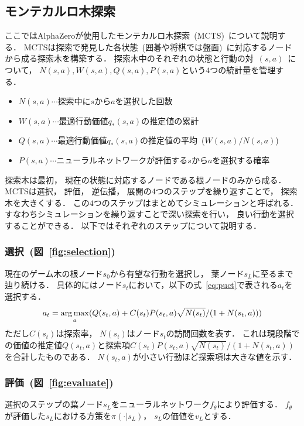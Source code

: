 \subsection{モンテカルロ木探索}
ここではAlphaZeroが使用したモンテカルロ木探索~(MCTS)~について説明する．
MCTSは探索で発見した各状態~(囲碁や将棋では盤面)~に対応するノードから成る探索木を構築する．
探索木中のそれぞれの状態と行動の対~$(s,a)$~について， ${N(s,a), W(s,a), Q(s,a), P(s,a)}$という$4$つの統計量を管理する．
\begin{itemize}
  \item $N(s,a) \cdots$探索中に$s$から$a$を選択した回数
  \item $W(s,a) \cdots$最適行動価値$q_*(s,a)$の推定値の累計
  \item $Q(s,a) \cdots$最適行動価値$q_*(s,a)$の推定値の平均~($W(s,a) / N(s,a)$)
  \item $P(s,a) \cdots$ニューラルネットワークが評価する$s$から$a$を選択する確率
\end{itemize}
探索木は最初， 現在の状態に対応するノードである根ノードのみから成る．
MCTSは選択， 評価， 逆伝播， 展開の$4$つのステップを繰り返すことで， 探索木を大きくする．
この$4$つのステップはまとめてシミュレーションと呼ばれる．
すなわちシミュレーションを繰り返すことで深い探索を行い， 良い行動を選択することができる．
以下ではそれぞれのステップについて説明する．
\subsubsection*{選択~(図~\ref{fig:selection})}
現在のゲーム木の根ノード$s_0$から有望な行動を選択し， 葉ノード$s_L$に至るまで辿り続ける．
具体的にはノード$s_t$において，以下の式~\ref{eq:puct}で表される$a_t$を選択する．
\begin{align}
  a_t = \operatorname*{arg\,max}_a(Q(s_t,a) + C(s_t)P(s_t,a)\sqrt{N(s_t)}/(1 + N(s_t,a)))
  \label{eq:puct}
\end{align}
ただし$C(s_t)$は探索率， $N(s_t)$はノード$s_t$の訪問回数を表す．
これは現段階での価値の推定値$Q(s_t,a)$と探索項$C(s_t)P(s_t,a)\sqrt{N(s_t)}/(1 + N(s_t,a))$を合計したものである．
$N(s_t,a)$が小さい行動ほど探索項は大きな値を示す．

\subsubsection*{評価~(図~\ref{fig:evaluate})}
選択のステップの葉ノード$s_L$をニューラルネットワーク$f_\theta$により評価する．
$f_\theta$が評価した$s_L$における方策を$\pi(\cdot|s_L)$， $s_L$の価値を$v_L$とする．

